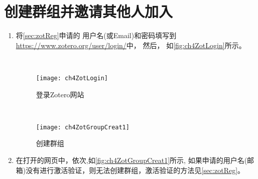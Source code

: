 \documentclass[cn,11pt,chinese]{elegantbook}
\begin{document}
\section{创建群组并邀请其他人加入}\label{sec:CreatGroup}
\begin{enumerate}
	\item    将\cref{sec:zotReg}申请的
	用户名(或Email)和密码填写到\url{https://www.zotero.org/user/login/}中，
	然后，
	如\autoref{fig:ch4ZotLogin}所示\label{page:zoteroLogin}。
		\begin{figure}[htbp]
			\centering\
			\begin{minipage}[t]{0.6\linewidth}
				\centering
				\texttt{[image: ch4ZotLogin]}
				\caption{登录Zotero网站}
				\label{fig:ch4ZotLogin}
			\end{minipage}
			\centering\
			\begin{minipage}[t]{0.3\linewidth}
				\centering
				\texttt{[image: ch4ZotGroupCreat1]}
				\caption{创建群组}
				\label{fig:ch4ZotGroupCreat1}
			\end{minipage}
		\end{figure}
	
	\item 在打开的网页中，依次,如\autoref{fig:ch4ZotGroupCreat1}所示,
	如果申请的用户名(邮箱)没有进行激活验证，则无法创建群组，激活验证的方法见\cref{sec:zotReg}。
	

\end{enumerate}
\end{document}
